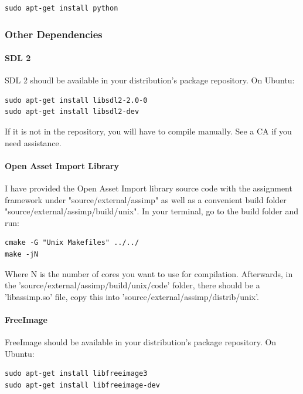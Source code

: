 \documentclass{article}
\begin{document}
\begin{lstlisting}
sudo apt-get install python
\end{lstlisting}

\subsubsection*{Other Dependencies}

\paragraph{\textbf{SDL 2}}

SDL 2 shoudl be available in your distribution's package repository. On Ubuntu:

\begin{lstlisting}
sudo apt-get install libsdl2-2.0-0
sudo apt-get install libsdl2-dev
\end{lstlisting}

If it is not in the repository, you will have to compile manually. See a CA if you need assistance.

\paragraph{\textbf{Open Asset Import Library}}

I have provided the Open Asset Import library source code with the assignment framework under "source/external/assimp" as well as a convenient build folder "source/external/assimp/build/unix". In your terminal, go to the build folder and run:

\begin{lstlisting}
cmake -G "Unix Makefiles" ../../
make -jN
\end{lstlisting}

Where N is the number of cores you want to use for compilation. Afterwards, in the 'source/external/assimp/build/unix/code' folder, there should be a 'libassimp.so' file, copy this into 'source/external/assimp/distrib/unix'.

\paragraph{\textbf{FreeImage}}

FreeImage should be available in your distribution's package repository. On Ubuntu:

\begin{lstlisting}
sudo apt-get install libfreeimage3
sudo apt-get install libfreeimage-dev
\end{lstlisting}
\end{document}
